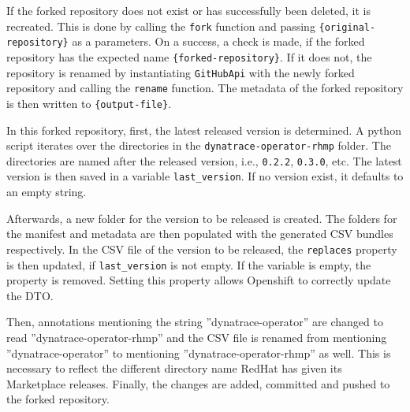 If the forked repository does not exist or has successfully been deleted, it is recreated.
This is done by calling the \verb|fork| function and passing \verb|{original-repository}| as a parameters.
On a success, a check is made, if the forked repository has the expected name \verb|{forked-repository}|.
If it does not, the repository is renamed by instantiating \verb|GitHubApi| with the newly forked repository and calling the \verb|rename| function.
The metadata of the forked repository is then written to \verb|{output-file}|.

In this forked repository, first, the latest released version is determined.
A python script iterates over the directories in the \verb|dynatrace-operator-rhmp| folder.
The directories are named after the released version, i.e., \verb|0.2.2|, \verb|0.3.0|, etc.
The latest version is then saved in a variable \verb|last_version|.
If no version exist, it defaults to an empty string.

Afterwards, a new folder for the version to be released is created.
The folders for the manifest and metadata are then populated with the generated CSV bundles respectively.
In the CSV file of the version to be released, the \verb|replaces| property is then updated, if \verb|last_version| is not empty.
If the variable is empty, the property is removed.
Setting this property allows Openshift to correctly update the DTO.

Then, annotations mentioning the string ''dynatrace-operator'' are changed to read ''dynatrace-operator-rhmp'' and the CSV file is renamed from  mentioning ''dynatrace-operator'' to mentioning ''dynatrace-operator-rhmp'' as well.
This is necessary to reflect the different directory name RedHat has given its Marketplace releases.
Finally, the changes are added, committed and pushed to the forked repository.
